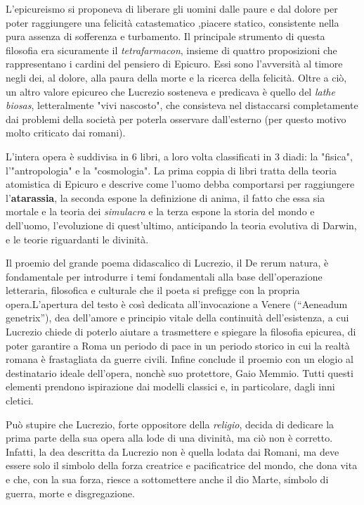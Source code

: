\documentclass[10pt,a4paper]{article}
\begin{document}
	L'epicureismo si proponeva di liberare gli uomini dalle paure e dal dolore per poter raggiungere una felicità catastematico ,piacere statico, consistente nella pura assenza di sofferenza e turbamento. 
	Il principale strumento di questa filosofia era sicuramente il \textit{tetrafarmacon}, insieme di quattro proposizioni che rappresentano i cardini del pensiero di Epicuro. Essi sono l'avversità al timore negli dei, al dolore, alla paura della morte e la ricerca della felicità.
	Oltre a ciò, un altro valore epicureo che Lucrezio sosteneva e predicava è quello del \textit{lathe biosas}, letteralmente "vivi nascosto", che consisteva nel distaccarsi completamente dai problemi della società per poterla osservare dall'esterno (per questo motivo molto criticato dai romani).
	
	L'intera opera è suddivisa in 6 libri, a loro volta classificati in 3 diadi: la "fisica", l'"antropologia" e la "cosmologia". La prima coppia di libri tratta della teoria atomistica di Epicuro e descrive come l'uomo debba comportarsi per raggiungere l'\textbf{atarassia}, la seconda espone la definizione di anima, il fatto che essa sia mortale e la teoria dei \textit{simulacra} e la terza espone la storia del mondo e dell'uomo, l'evoluzione di quest'ultimo, anticipando la teoria evolutiva di Darwin, e le teorie riguardanti le divinità.
	
	Il proemio del grande poema didascalico di Lucrezio, il De rerum natura, è fondamentale per introdurre i temi fondamentali alla base dell’operazione letteraria, filosofica e culturale che il poeta si prefigge con la propria opera.L’apertura del testo è così dedicata all’invocazione a Venere (“Aeneadum genetrix”), dea dell’amore e principio vitale della continuità dell’esistenza, a cui Lucrezio chiede di poterlo aiutare a trasmettere e spiegare la filosofia epicurea, di poter garantire a Roma un periodo di pace in un periodo storico in cui la realtà romana è frastagliata da guerre civili. Infine conclude il proemio con un elogio al destinatario ideale dell'opera, nonchè suo protettore, Gaio Memmio. Tutti questi elementi prendono ispirazione dai modelli classici e, in particolare, dagli inni cletici.
	
	Può stupire che Lucrezio, forte oppositore della \textit{religio}, decida di dedicare la prima parte della sua opera alla lode di una divinità, ma ciò non è corretto. Infatti, la dea descritta da Lucrezio non è quella lodata dai Romani, ma deve essere solo il simbolo della forza creatrice e pacificatrice del mondo, che dona vita e che, con la sua forza, riesce a sottomettere anche il dio Marte, simbolo di guerra, morte e disgregazione.
	
\end{document}
